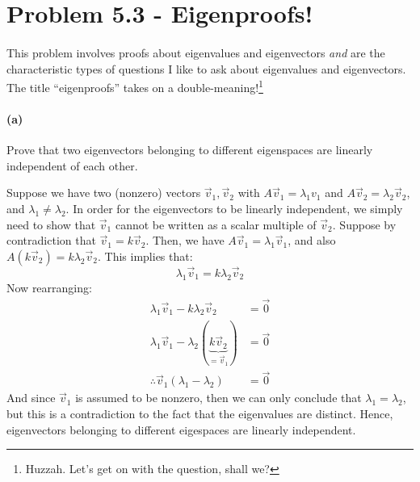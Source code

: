 \documentclass{article}
\begin{document}
\bigskip
\dphline
\pagebreak
\section*{Problem 5.3 - Eigenproofs!}

\paragraph{}
This problem involves proofs about eigenvalues and eigenvectors \emph{and} are the characteristic types of questions I like to ask about eigenvalues and eigenvectors.  The title
``eigenproofs'' takes on a double-meaning!\footnote{Huzzah.  Let's get on with the question, shall we?}

\paragraph{(a)}
Prove that two eigenvectors belonging to different eigenspaces are linearly independent of each other.

\begin{solution}
	Suppose we have two (nonzero) vectors $\vec v_1,\vec v_2$ with $A\vec v_1 = \lambda_1 v_1$ and $A \vec v_2 = 
	\lambda_2 \vec v_2$, and $\lambda_1 \neq \lambda_2$. In order for the eigenvectors to be linearly 
	independent, we simply need to show that $\vec v_1$ cannot be written as a scalar multiple of $\vec v_2$. 
	Suppose by contradiction that $\vec v_1 = k \vec v_2$. Then, we have $A \vec v_1 = \lambda_1 \vec v_1$, 
	and also $A(k \vec v_2) = k \lambda_2 \vec v_2$. This implies that:
	\[
	\lambda_1 \vec v_1 = k \lambda_2 \vec v_2 
	\] 
	Now rearranging:
	\begin{align*}
		\lambda_1 \vec v_1 - k\lambda_2\vec v_2 &= \vec 0\\
		\lambda_1 \vec v_1 - \lambda_2(\underbrace{k \vec v_2}_{= \vec v_1}) &= \vec 0\\
		\therefore \vec v_1(\lambda_1 - \lambda_2) &= \vec 0
	\end{align*}
	And since $\vec v_1$ is assumed to be nonzero, then we can only conclude that $\lambda_1 = \lambda_2$, but 
	this is a contradiction to the fact that the eigenvalues are distinct. Hence, eigenvectors belonging 
	to different eigespaces are linearly independent. 
\end{solution}
\end{document}
